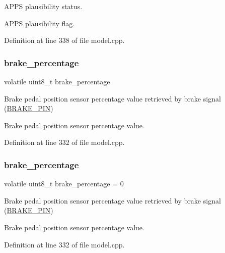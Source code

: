 A\+P\+PS plausibility status. 

A\+P\+PS plausibility flag. 

Definition at line 338 of file model.\+cpp.

\mbox{\label{group___board__model__group_ga8e50a30864da7026531520887968d4c0}} 
\subsubsection{\texorpdfstring{brake\+\_\+percentage}{brake\_percentage}\hspace{0.1cm}{\footnotesize\ttfamily [1/2]}}
{\footnotesize\ttfamily volatile uint8\+\_\+t brake\+\_\+percentage}



Brake pedal position sensor percentage value retrieved by brake signal (\mbox{\hyperlink{group___board__pinout__group_gad632b56bf4c6259a390c3db91607078e}{B\+R\+A\+K\+E\+\_\+\+P\+IN}}) 

Brake pedal position sensor percentage value. 

Definition at line 332 of file model.\+cpp.

\mbox{\label{group___board__model__group_ga8e50a30864da7026531520887968d4c0}} 
\subsubsection{\texorpdfstring{brake\+\_\+percentage}{brake\_percentage}\hspace{0.1cm}{\footnotesize\ttfamily [2/2]}}
{\footnotesize\ttfamily volatile uint8\+\_\+t brake\+\_\+percentage = 0}



Brake pedal position sensor percentage value retrieved by brake signal (\mbox{\hyperlink{group___board__pinout__group_gad632b56bf4c6259a390c3db91607078e}{B\+R\+A\+K\+E\+\_\+\+P\+IN}}) 

Brake pedal position sensor percentage value. 

Definition at line 332 of file model.\+cpp.

